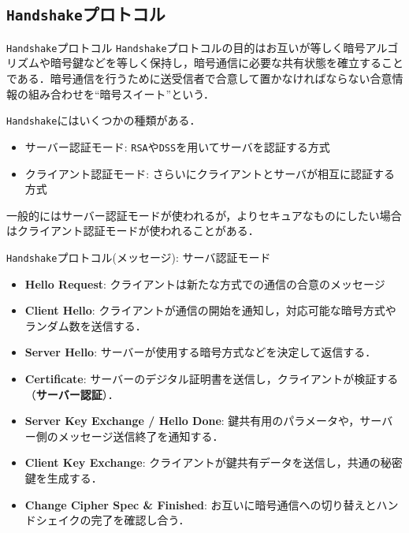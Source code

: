 \documentclass[11pt, aspectratio=169]{beamer}
\begin{document}
\subsection{\texttt{Handshake}プロトコル}

\begin{frame}{\texttt{Handshake}プロトコル}
  \texttt{Handshake}プロトコルの目的はお互いが等しく暗号アルゴリズムや暗号鍵などを等しく保持し，暗号通信に必要な共有状態を確立することである．暗号通信を行うために送受信者で合意して置かなければならない合意情報の組み合わせを``暗号スイート''という．

\vspace{1em}

  \texttt{Handshake}にはいくつかの種類がある．
  \begin{itemize}
    \item サーバー認証モード: \texttt{RSA}や\texttt{DSS}を用いてサーバを認証する方式
    \item クライアント認証モード: さらいにクライアントとサーバが相互に認証する方式
  \end{itemize}

  一般的にはサーバー認証モードが使われるが，よりセキュアなものにしたい場合はクライアント認証モードが使われることがある．
\end{frame}

\begin{frame}{\texttt{Handshake}プロトコル(メッセージ): サーバ認証モード}
  \begin{itemize}
    \item \textbf{Hello Request}: クライアントは新たな方式での通信の合意のメッセージ
    \item \textbf{Client Hello}: クライアントが通信の開始を通知し，対応可能な暗号方式やランダム数を送信する．
    \item \textbf{Server Hello}: サーバーが使用する暗号方式などを決定して返信する．
    \item \textbf{Certificate}: サーバーのデジタル証明書を送信し，クライアントが検証する（\textbf{サーバー認証}）．
    \item \textbf{Server Key Exchange / Hello Done}: 鍵共有用のパラメータや，サーバー側のメッセージ送信終了を通知する．
    \item \textbf{Client Key Exchange}: クライアントが鍵共有データを送信し，共通の秘密鍵を生成する．
    \item \textbf{Change Cipher Spec \& Finished}: お互いに暗号通信への切り替えとハンドシェイクの完了を確認し合う．
  \end{itemize}
\end{frame}
\end{document}
